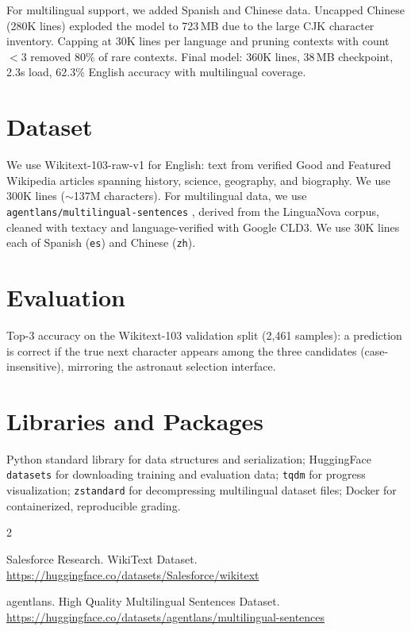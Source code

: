 \documentclass[11pt]{article}
\begin{document}
For multilingual support, we added Spanish and Chinese data. Uncapped Chinese (280K lines) exploded the model to 723\,MB due to the large CJK character inventory. Capping at 30K lines per language and pruning contexts with count $< 3$ removed 80\% of rare contexts. Final model: 360K lines, 38\,MB checkpoint, 2.3s load, 62.3\% English accuracy with multilingual coverage.

\section*{Dataset}

We use Wikitext-103-raw-v1 \cite{wikitext} for English: text from verified Good and Featured Wikipedia articles spanning history, science, geography, and biography. We use 300K lines ($\sim$137M characters). For multilingual data, we use \texttt{agentlans/multilingual-sentences} \cite{multilingual}, derived from the LinguaNova corpus, cleaned with textacy and language-verified with Google CLD3. We use 30K lines each of Spanish (\texttt{es}) and Chinese (\texttt{zh}).

\section*{Evaluation}

Top-3 accuracy on the Wikitext-103 validation split (2,461 samples): a prediction is correct if the true next character appears among the three candidates (case-insensitive), mirroring the astronaut selection interface.

\section*{Libraries and Packages}

Python standard library for data structures and serialization; HuggingFace \texttt{datasets} for downloading training and evaluation data; \texttt{tqdm} for progress visualization; \texttt{zstandard} for decompressing multilingual dataset files; Docker for containerized, reproducible grading.

\begin{thebibliography}{2}

Salesforce Research.
\newblock WikiText Dataset.
\newblock \url{https://huggingface.co/datasets/Salesforce/wikitext}

agentlans.
\newblock High Quality Multilingual Sentences Dataset.
\newblock \url{https://huggingface.co/datasets/agentlans/multilingual-sentences}

\end{thebibliography}
\end{document}
